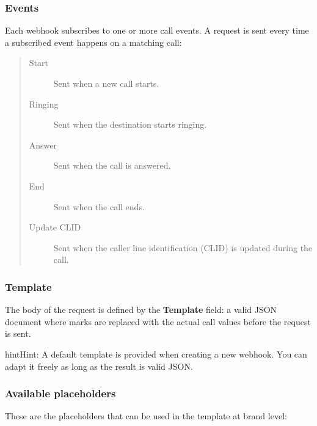 \documentclass[letterpaper,10pt,english]{sphinxmanual}
\begin{document}
\subsubsection{Events}
\label{administration_portal/brand/calls/webhooks:events}
Each webhook subscribes to one or more call events. A  request is sent every time a subscribed
event happens on a matching call:
\begin{quote}
\begin{description}
\item[{Start}] \leavevmode
Sent when a new call starts.

\item[{Ringing}] \leavevmode
Sent when the destination starts ringing.

\item[{Answer}] \leavevmode
Sent when the call is answered.

\item[{End}] \leavevmode
Sent when the call ends.

\item[{Update CLID}] \leavevmode
Sent when the caller line identification (CLID) is updated during the call.

\end{description}
\end{quote}


\subsubsection{Template}
\label{administration_portal/brand/calls/webhooks:template}
The body of the  request is defined by the \textbf{Template} field: a valid JSON document where
 marks are replaced with the actual call values before the request is sent.

\begin{notice}{hint}{Hint:}
A default template is provided when creating a new webhook. You can adapt it freely as long
as the result is valid JSON.
\end{notice}


\subsubsection{Available placeholders}
\label{administration_portal/brand/calls/webhooks:available-placeholders}
These are the placeholders that can be used in the template at brand level:
\end{document}
